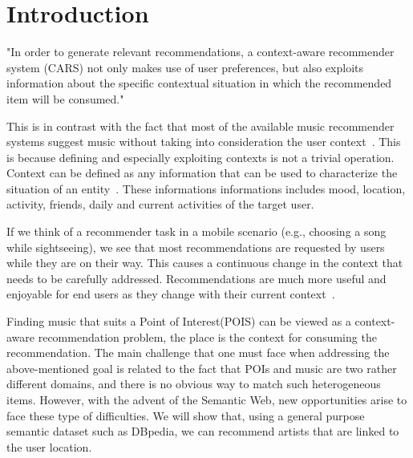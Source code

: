 \documentclass[paper=a4, fontsize=11pt]{scrartcl}
\begin{document}
\tableofcontents
\newpage

\section{Introduction}
"In order to generate relevant recommendations, a context-aware recommender system (CARS) not only makes use of user preferences, but also exploits information about the specific contextual situation in which the recommended item will be consumed."~\cite{Baltrunas:2012:CRA:2339097.2339111}

This is in contrast with the fact that most of the available music recommender systems suggest music without taking into consideration the user context~\cite{Knees:2013:SMS:2559928.2542206}. This is because defining and especially exploiting contexts is not a trivial operation. Context can be defined as any information that can be used to characterize the situation of an entity~\cite{Dey:2001:UUC:593570.593572}. These informations informations includes mood, location, activity, friends, daily and current activities of the target user.

If we think of a recommender task in a mobile scenario (e.g., choosing a song while sightseeing), we see that most recommendations are requested by users while they are on their way. This causes a continuous change in the context that needs to be carefully addressed. Recommendations are much more useful and enjoyable for end users as they change with their current context~\cite{Ostuni:2012:CCM:2887638.2887642}.

Finding music that suits a Point of Interest(POIS) can be viewed as a context-aware recommendation problem, the place is the context for consuming the recommendation. The main challenge that one must face when addressing the above-mentioned goal is related to the fact that POIs and music are two rather different domains, and there is no obvious way to match such heterogeneous items. However, with the advent of the Semantic Web, new opportunities arise to face these type of difficulties. We will show that, using a general purpose semantic dataset such as DBpedia, we can recommend artists that are linked to the user location.
\end{document}

